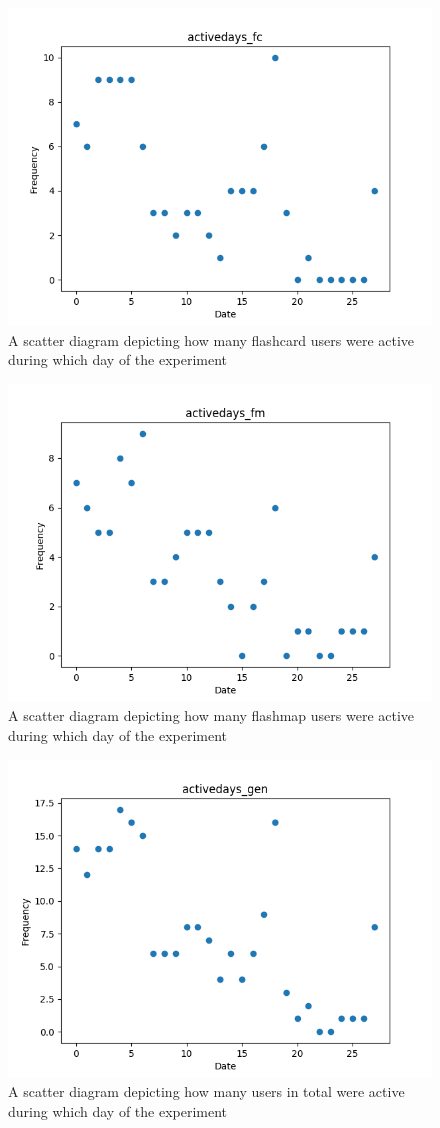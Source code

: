 \begin{figure}
    \centering
    \includegraphics[width=.7\textwidth]{img/activedays_fc.png}
    \caption{A scatter diagram depicting how many flashcard users were active during which day of the experiment}
    \label{fig:activedays_fc}
\end{figure}
\begin{figure}
    \centering
    \includegraphics[width=.7\textwidth]{img/activedays_fm.png}
    \caption{A scatter diagram depicting how many flashmap users were active during which day of the experiment}
    \label{fig:activedays_fm}
\end{figure}
\begin{figure}
    \centering
    \includegraphics[width=.7\textwidth]{img/activedays_gen.png}
    \caption{A scatter diagram depicting how many users in total were active during which day of the experiment}
    \label{fig:activedays_gen}
\end{figure}

